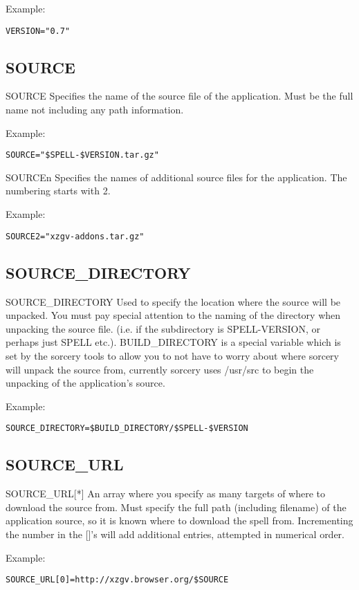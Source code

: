 \documentclass[a4paper,10pt]{book}
\begin{document}
Example:
\begin{verbatim}
VERSION="0.7"
\end{verbatim}

\subsection{SOURCE}
SOURCE
	Specifies the name of the source file of the application. Must be the
	full name not including any path information.

Example:
\begin{verbatim}
SOURCE="$SPELL-$VERSION.tar.gz"
\end{verbatim}

SOURCEn
	Specifies the names of additional source files for the application.
	The numbering starts with 2.

Example:
\begin{verbatim}
SOURCE2="xzgv-addons.tar.gz"
\end{verbatim}

\subsection{SOURCE\_DIRECTORY}
SOURCE\_DIRECTORY
	Used to specify the location where the source will be unpacked. You
	must pay special attention to the naming of the directory when
	unpacking the source file. (i.e. if the subdirectory is
	\textdollar SPELL-\textdollar VERSION, or perhaps just \textdollar
SPELL etc.). \textdollar BUILD\_DIRECTORY is a
	special variable which is set by the sorcery tools to allow you to
	not have to worry about where sorcery will unpack the source from,
	currently sorcery uses /usr/src to begin the unpacking of the
	application's source.

Example:
\begin{verbatim}
SOURCE_DIRECTORY=$BUILD_DIRECTORY/$SPELL-$VERSION
\end{verbatim}

\subsection{SOURCE_URL}
SOURCE\_URL[*]
	An array where you specify as many targets of where to download the
	source from. Must specify the full path (including filename) of the
	application source, so it is known where to download the spell from.
	Incrementing the number in the []'s will add additional entries,
	attempted in numerical order.

Example:
\begin{verbatim}
SOURCE_URL[0]=http://xzgv.browser.org/$SOURCE
\end{verbatim}
\end{document}
